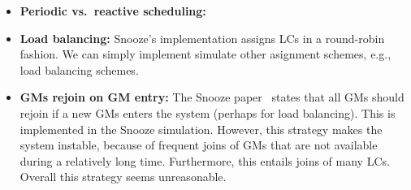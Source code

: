 \begin{itemize}
  \item \textbf{Periodic vs.\ reactive scheduling:} 
  \item \textbf{Load balancing:} Snooze's implementation assigns LCs
    in a round-robin fashion. We can simply implement simulate other
    asignment schemes, e.g., load balancing schemes.
  \item \textbf{GMs rejoin on GM entry:} The Snooze paper~\cite{frm12a}
    states that all GMs should rejoin if a new GMs enters the system
    (perhaps for load balancing). This is implemented in the Snooze
    simulation. However, this strategy makes the system instable,
    because of frequent joins of GMs that are not available during a
    relatively long time. Furthermore, this entails joins of many
    LCs. Overall this strategy seems unreasonable.
\end{itemize}



